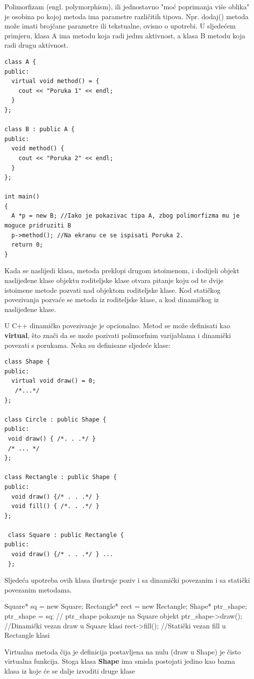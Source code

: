 \documentclass[11pt]{book}
\begin{document}
Polimorfizam (engl. polymorphism),  ili  jednostavno  "moć  poprimanja  više  oblika"  je osobina  po  kojoj metoda ima  parametre  različitih tipova.  Npr.  dodaj()  metoda  može  imati brojčane parametre ili tekstualne, ovisno o upotrebi. U sljedećem primjeru, klasa A ima metodu koja radi jednu aktivnost, a klasa B metodu koja radi drugu aktivnost.
\begin{lstlisting}
class A { 
public: 
  virtual void method() = { 
    cout << "Poruka 1" << endl; 
  }  
}; 
 
class B : public A { 
public: 
  void method() { 
    cout << "Poruka 2" << endl; 
  } 
}; 
 
int main() 
{ 
  A *p = new B; //Iako je pokazivac tipa A, zbog polimorfizma mu je moguce pridruziti B 
  p->method(); //Na ekranu ce se ispisati Poruka 2. 
  return 0; 
} 
\end{lstlisting}
Kada se naslijedi klasa, metoda preklopi drugom istoimenom, i dodijeli objekt naslijeđene klase objektu roditeljske klase otvara pitanje koju od te dvije istoimene metode pozvati nad objektom roditeljske klase. Kod statičkog povezivanja pozvaće se metoda iz roditeljske klase, a kod dinamičkog iz naslijeđene klase.

U C++ dinamičko povezivanje je opcionalno. Metod se može definisati kao \textbf{virtual}, što znači da  se  može  pozivati  polimorfnim  varijablama  i  dinamički  povezati  s  porukama.  Neka  su definisane sljedeće klase:

\begin{lstlisting}
class Shape {  
public:  
  virtual void draw() = 0;  
   /*...*/
};  
 
class Circle : public Shape {  
public: 
 void draw() { /*. . .*/ } 
 /* ... */
};  
 
class Rectangle : public Shape {  
public:  
  void draw() {/* . . .*/ }  
  void fill() { /*. . .*/ }   
}; 
 
 class Square : public Rectangle {  
public:  
  void draw() {/* . . .*/ } ... 
 };  
\end{lstlisting}
Sljedeća upotreba ovih klasa ilustruje poziv i sa dinamički povezanim i sa statički povezanim metodama.
\begin{shortlisting}
  Square* sq = new Square;
  Rectangle* rect = new Rectangle;
  Shape* ptr_shape;
  ptr_shape = sq; // ptr_shape pokazuje na Square objekt
  ptr_shape->draw(); //Dinamički vezan draw u Square klasi
  rect->fill(); //Statički vezan fill u Rectangle klasi
\end{shortlisting}
Virtualna metoda čija je definicija postavljena na nulu (draw u Shape) je čisto virtualna funkcija. Stoga klasa \textbf{Shape} ima smisla postojati jedino kao bazna klasa iz koje će se dalje izvoditi druge klase
\end{document}

